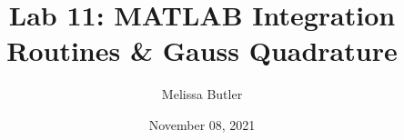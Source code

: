 \newcommand{\course}{MATH 3341}
\title{Lab 11: MATLAB Integration Routines \& Gauss Quadrature}
\author{Melissa Butler}
\date{November 08, 2021}
